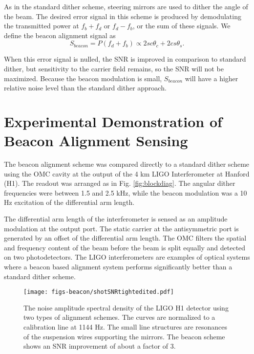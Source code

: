 As in the standard dither scheme, steering mirrors are used to dither the angle of the beam. %
The desired error signal in this scheme is produced by demodulating the transmitted power at $f_b+f_d$ or $f_d-f_b$, or the sum of these signals. %
We define the beacon alignment signal as
%
\begin{equation}
\label{eq:sbeacon}
S_{beacon}=P(f_d+f_b) \propto 2sc\theta_c+2cs\theta_s.
\end{equation}
%

When this error signal is nulled, the SNR is improved in comparison to standard dither, but sensitivity to the carrier field remains, so the SNR will not be maximized. %
Because the beacon modulation is small, $S_{beacon}$ will have a higher relative noise level than the standard dither approach.

\section{Experimental Demonstration of Beacon Alignment Sensing}
%


The beacon alignment scheme was compared directly to a standard dither scheme using the OMC cavity at the output of the 4 km LIGO Interferometer at Hanford (H1). %
The readout was arranged as in Fig. %
\ref{fig:blockdiag}. %
The angular dither frequencies were between 1.5 and 2.5 kHz, while the beacon modulation was a 10 Hz excitation of the differential arm length. %


The differential arm length of the interferometer is sensed as an amplitude modulation at the output port. %
The static carrier at the antisymmetric port is generated by an offset of the differential arm length. %
The OMC filters the spatial and frequency content of the beam before the beam is split equally and detected on two photodetectors. %
The LIGO interferometers are examples of optical systems where a beacon based alignment system performs significantly better than a standard dither scheme. %


%
\begin{figure}
  \begin{center}
  \leavevmode
  \texttt{[image: figs-beacon/shotSNRtightedited.pdf]}
  \end{center}
  \caption[An instance of the noise performance of beacon alignment sensign.]{The noise amplitude spectral density of the LIGO H1 detector using two types of alignment schemes. The curves are normalized to a calibration line at 1144 Hz.  The small line structures are resonances of the suspension wires supporting the mirrors. The beacon scheme shows an SNR improvement of about a factor of 3.}
  \label{fig:shotnoise}
\end{figure}

